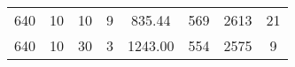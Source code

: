 \begin{table}[H]
\begin{tabular}{l|ccccccc}
 640                                                                  & 10                                                                                                                                                             & 10                                                                                                                               & 9                                                                                                                                                              & 835.44                                                                                                                           & 569                          & 2613                         & 21                                                                   \\
 640                                                                  & 10                                                                                                                                                             & 30                                                                                                                               & 3                                                                                                                                                              & 1243.00                                                                                                                          & 554                          & 2575                         & 9                                                                    \\
        \hline
    \end{tabular}
\end{table}